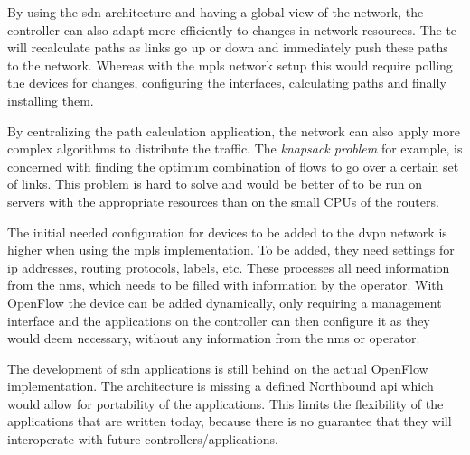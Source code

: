 By using the \ac{sdn} architecture and having a global view of the network, the controller can also adapt more efficiently to changes in network resources. The \ac{te} will recalculate paths as links go up or down and immediately push these paths to the network. Whereas with the \ac{mpls} network setup this would require polling the devices for changes, configuring the interfaces, calculating paths and finally installing them. 

By centralizing the path calculation application, the network can also apply more complex algorithms to distribute the traffic. The \textsl{knapsack problem} for example, is concerned with finding the optimum combination of flows to go over a certain set of links. This problem is hard to solve and would be better of to be run on servers with the appropriate resources than on the small CPUs of the routers. 

The initial needed configuration for devices to be added to the \ac{dvpn} network is higher when using the \ac{mpls} implementation. To be added, they need settings for \ac{ip} addresses, routing protocols, labels, etc. These processes all need information from the \ac{nms}, which needs to be filled with information by the operator. With OpenFlow the device can be added dynamically, only requiring a management interface and the applications on the controller can then configure it as they would deem necessary, without any information from the \ac{nms} or operator.

The development of \ac{sdn} applications is still behind on the actual OpenFlow implementation. The architecture is missing a defined Northbound \ac{api} which would allow for portability of the applications. This limits the flexibility of the applications that are written today, because there is no guarantee that they will interoperate with future controllers/applications.




